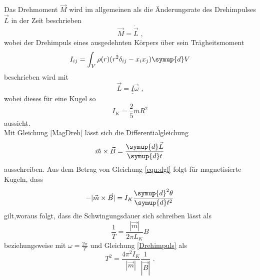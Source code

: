 \noindent Das Drehmoment $\vec{M}$ wird im allgemeinen als die Änderungsrate des Drehimpulses $\vec{L}$ in der Zeit beschrieben
\begin{equation}
    \vec{M}=\dot{\vec{L}}\text{ ,}
\end{equation}
wobei der Drehimpuls eines ausgedehnten Körpers über sein Trägheitsmoment 
\begin{equation}
    I_{ij}=\int_V\rho(r)(r^2\delta_{ij}-x_ix_j)\symup{d}V
\end{equation}
beschrieben wird mit 
\begin{equation}
    \vec{L}=\underline{\underline{I}}\vec{\omega}\text{ ,}
    \label{eqn:Drehimpuls}
\end{equation}
wobei dieses für eine Kugel so
\begin{equation}
    I_K=\frac{2}{5}mR^2
    \label{eqn:trägheit_kugel}
\end{equation}
aussieht. \\

\noindent Mit Gleichung \ref{MagDreh} lässt sich die Differentialgleichung
\begin{equation}
    \vec{m}\times\vec{B}=\frac{\symup{d}\vec{L}}{\symup{d}t}
    \label{eqn:dgl}
\end{equation}
ausschreiben.
Aus dem Betrag von Gleichung \ref{eqn:dgl} folgt für magnetisierte Kugeln, dass
\begin{equation}
    -|\vec{m}\times\vec{B}|=I_K\frac{\symup{d}^2\theta}{\symup{d}t^2}
    \label{eqn:dglmagmom}
\end{equation}
gilt,woraus folgt, dass die Schwingungsdauer sich schreiben lässt als
\begin{equation}
    \frac{1}{T}=\frac{|\vec{m}|}{2\pi L_K}B
\end{equation}
beziehungsweise mit $\omega=\frac{2\pi}{T}$ und Gleichung \ref{Drehimpuls} als
\begin{equation}
    T^2=\frac{4\pi^2I_K}{|\vec{m}|}\frac{1}{|\vec{B}|}\text{ .}
    \label{eqn:schwingdauer}
\end{equation}

